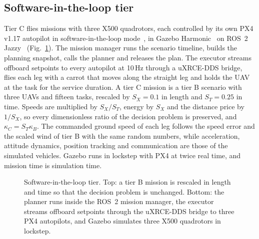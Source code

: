 \subsection{Software-in-the-loop tier}
Tier C flies missions with three X500 quadrotors, each controlled by its own PX4 v1.17 autopilot in software-in-the-loop
mode~\cite{meier2015px4}, in Gazebo Harmonic~\cite{koenig2004gazebo} on ROS~2 Jazzy~\cite{macenski2022ros2}
(Fig.~\ref{fig:tierc}). The mission manager runs the scenario timeline, builds the planning snapshot, calls the planner
and releases the plan. The executor streams offboard setpoints to every autopilot at 10\,Hz through a uXRCE-DDS bridge,
flies each leg with a carrot that moves along the straight leg and holds the UAV at the task for the service duration.
A tier C mission is a tier B scenario with three UAVs and fifteen tasks, rescaled by $S_X=0.1$ in length and $S_T=0.25$
in time. Speeds are multiplied by $S_X/S_T$, energy by $S_X$ and the distance price by $1/S_X$, so every dimensionless
ratio of the decision problem is preserved, and $\kappa_C=S_T\kappa_B$. The commanded ground speed of each leg follows
the speed error and the scaled wind of tier B with the same random numbers, while acceleration, attitude dynamics,
position tracking and communication are those of the simulated vehicles. Gazebo runs in lockstep with PX4 at twice
real time, and mission time is simulation time.

\begin{figure}[t]
\centering
{}
\caption{Software-in-the-loop tier. Top: a tier B mission is rescaled in length and time so that the decision problem
is unchanged. Bottom: the planner runs inside the ROS~2 mission manager, the executor streams offboard setpoints through
the uXRCE-DDS bridge to three PX4 autopilots, and Gazebo simulates three X500 quadrotors in lockstep.}\label{fig:tierc}
\end{figure}

